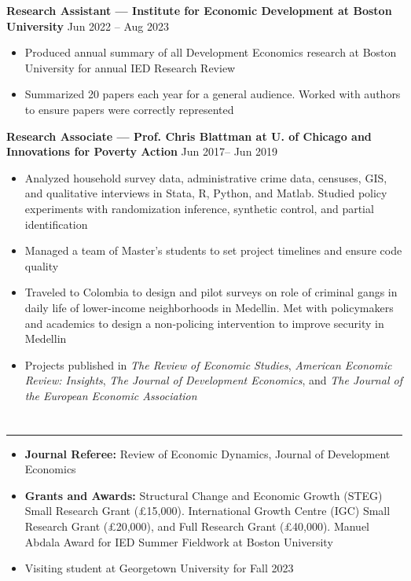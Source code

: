 \documentclass[10.5pt]{article}
\newenvironment{customitemize}
{ \begin{itemize}[leftmargin=\parindent, topsep = 0.2pt, itemsep = -3pt] }
{\end{itemize} }
\begin{document}
\noindent \textbf{Research Assistant --- Institute for Economic Development at Boston University}  \hfill Jun 2022 -- Aug 2023
\begin{customitemize}
	\item Produced annual summary of all Development Economics research at Boston University for annual IED Research Review
	\item Summarized 20 papers each year for a general audience. Worked with authors to ensure papers were correctly represented
\end{customitemize}

\noindent \textbf{Research Associate --- Prof. Chris Blattman at U. of Chicago and Innovations for Poverty Action}  \hfill Jun 2017-- Jun 2019 
\begin{customitemize}
	\item Analyzed household survey data, administrative crime data, censuses, GIS, and qualitative interviews in Stata, R, Python, and Matlab. Studied policy experiments with randomization inference, synthetic control, and partial identification
	\item Managed a team of Master's students to set project timelines and ensure code quality 
	\item Traveled to Colombia to design and pilot surveys on role of criminal gangs in daily life of lower-income neighborhoods in Medellin. Met with policymakers and academics to design a non-policing intervention to improve security in Medellin
	\item Projects published in \textit{The Review of Economic Studies}, \textit{American Economic Review: Insights}, \textit{The Journal of Development Economics}, and \textit{The Journal of the European Economic Association}
\end{customitemize}

\section*{} 
\noindent \rule{\textwidth}{1pt} 
\begin{customitemize}
	\item \textbf{Journal Referee:} Review of Economic Dynamics, Journal of Development Economics
	\item \textbf{Grants and Awards:} Structural Change and Economic Growth (STEG) Small Research Grant (\pounds15,000). International Growth Centre (IGC) Small Research Grant (\pounds20,000), and Full Research Grant (\pounds40,000). Manuel Abdala Award for IED Summer Fieldwork at Boston University
	\item Visiting student at Georgetown University for Fall 2023
\end{customitemize}
\end{document}
